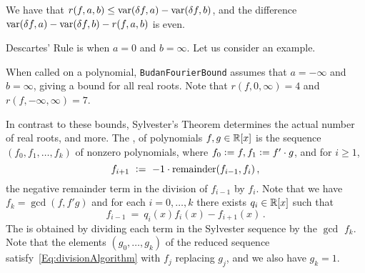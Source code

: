 \begin{theorem}
  We have that $r(f,a,b)\leq \operatorname{{\rm var}}(\delta f,a) -\operatorname{{\rm var}}(\delta f,b)$, and the difference
  $\operatorname{{\rm var}}(\delta f,a) -\operatorname{{\rm var}}(\delta f,b)-r(f,a,b)$ is even. 
\end{theorem}

Descartes' Rule is when $a=0$ and $b=\infty$.
Let us consider an example.
%
\begin{leftbar}

\end{leftbar}
%
When called on a polynomial, \texttt{BudanFourierBound} assumes that $a=-\infty$ and $b=\infty$, giving a bound for all real roots.
Note that $r(f,0,\infty)=4$ and $r(f,-\infty,\infty)=7$.

In contrast to these bounds, 
Sylvester's Theorem determines the actual number of real roots, and more.
The ,  of polynomials $f,g\in\mathbb{R}[x]$ is the sequence
$\left(f_0,f_1,\dotsc,f_k\right)$ of nonzero polynomials, where $f_0\vcentcolon= f, f_1 \vcentcolon= f'\cdot g$,
and for $i\geq 1$, 
%
  \[
    f_{i+1}\ \vcentcolon=\ -1\cdot \mbox{remainder}(f_{i-1},f_i)\,,
  \]
%
the negative remainder term in the division of $f_{i-1}$ by $f_i$.
Note that we have $f_k = \gcd(f,f'g)$ and for each $i=0,\dotsc,k$ there exists $q_i\in\mathbb{R}[x]$ such that
%
 \begin{equation}\label{Eq:divisionAlgorithm}
    f_{i-1}\ =\ q_i(x)f_i(x)-f_{i+1}(x)\,.
 \end{equation}
%
The  is obtained by dividing each term in the Sylvester sequence by the $\gcd$ $f_k$.
Note that the elements $(g_0,\dotsc,g_k)$ of the reduced sequence satisfy~\eqref{Eq:divisionAlgorithm} with $f_j$ replacing $g_j$, and
we also have $g_k=1$.

